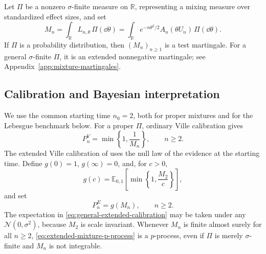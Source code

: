 Let \(\Pi\) be a nonzero \(\sigma\)-finite measure on \(\mathbb R\),
representing a mixing measure over standardized effect sizes, and set
\begin{equation}
\label{eq:Mn-def}
  M_n
  =
  \int_{\mathbb R}L_{n,\theta}\,\Pi(\dd\theta)
  =
  \int_{\mathbb R}
  e^{-n\theta^2/2}A_n(\theta U_n)\,\Pi(\dd\theta).
\end{equation}
If \(\Pi\) is a probability distribution, then
\((M_n)_{n\geq1}\) is a test martingale. For a general
\(\sigma\)-finite \(\Pi\), it is an extended nonnegative martingale;
see Appendix~\ref{app:mixture-martingales}.


\subsection{Calibration and Bayesian interpretation}
\label{subsec:ville}
\label{subsec:bayesian-t-test}

We use the common starting time \(n_0=2\), both for proper mixtures and
for the Lebesgue benchmark below. For a proper \(\Pi\), ordinary Ville
calibration gives
\begin{equation}
\label{eq:proper-mixture-p-process}
  P_n^V
  =
  \min\left\{1,\frac1{M_n}\right\},
  \qquad n\geq2.
\end{equation}
The extended Ville calibration of \citet{Wang2025a} uses the null law
of the evidence at the starting time. Define \(g(0)=1\), \(g(\infty)=0\), and, for
\(c>0\),
\begin{equation}
\label{eq:general-extended-calibration}
  g(c)
  =
  \mathbb E_{0,1}
  \left[
    \min\left\{1,\frac{M_2}{c}\right\}
  \right],
\end{equation}
and set
\begin{equation}
\label{eq:extended-mixture-p-process}
  P_n^E
  =
  g(M_n),
  \qquad n\geq2.
\end{equation}
The expectation in \eqref{eq:general-extended-calibration} may be taken
under any \(\mathcal N(0,\sigma^2)\), because \(M_2\) is scale
invariant. Whenever \(M_n\) is finite almost surely for all
\(n\geq2\), \eqref{eq:extended-mixture-p-process} is a \(p\)-process,
even if \(\Pi\) is merely \(\sigma\)-finite and \(M_n\) is not
integrable.

